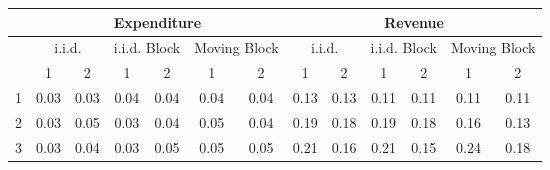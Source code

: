 %

\begin{tabular}{@{}lcccccccccccc@{}}
	\toprule
	& \multicolumn{6}{c}{ Expenditure } & \multicolumn{6}{c}{ Revenue } \\ \hline
	& \multicolumn{2}{c}{ i.i.d.} & \multicolumn{2}{c}{ i.i.d. Block } & \multicolumn{2}{c}{ Moving Block } & \multicolumn{2}{c}{ i.i.d.} & \multicolumn{2}{c}{ i.i.d. Block } & \multicolumn{2}{c}{ Moving Block } \\
	\hline
	\diagbox{$\tau$}{$q$} & 1 & 2 & 1 & 2 & 1 & 2 & 1 & 2 & 1 & 2 & 1 & 2 \\
	\hline
	1  & 0.03 & 0.03 & 0.04 & 0.04 & 0.04 & 0.04 & 0.13 & 0.13 & 0.11 & 0.11 & 0.11 & 0.11\\
	2 & 0.03 & 0.05 & 0.03 & 0.04 & 0.05 & 0.04 & 0.19 & 0.18 & 0.19 & 0.18 & 0.16 & 0.13 \\
	3 & 0.03 & 0.04 & 0.03 & 0.05 & 0.05 & 0.05 & 0.21 & 0.16 & 0.21 & 0.15 & 0.24 & 0.18 \\
	\bottomrule
\end{tabular}

